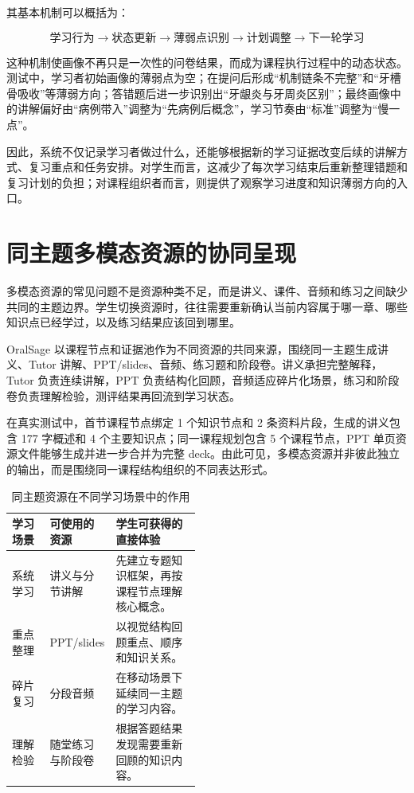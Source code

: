 其基本机制可以概括为：

\[
\text{学习行为}
\rightarrow
\text{状态更新}
\rightarrow
\text{薄弱点识别}
\rightarrow
\text{计划调整}
\rightarrow
\text{下一轮学习}
\]

这种机制使画像不再只是一次性的问卷结果，而成为课程执行过程中的动态状态。测试中，学习者初始画像的薄弱点为空；在提问后形成“机制链条不完整”和“牙槽骨吸收”等薄弱方向；答错题后进一步识别出“牙龈炎与牙周炎区别”；最终画像中的讲解偏好由“病例带入”调整为“先病例后概念”，学习节奏由“标准”调整为“慢一点”。

因此，系统不仅记录学习者做过什么，还能够根据新的学习证据改变后续的讲解方式、复习重点和任务安排。对学生而言，这减少了每次学习结束后重新整理错题和复习计划的负担；对课程组织者而言，则提供了观察学习进度和知识薄弱方向的入口。

\section{同主题多模态资源的协同呈现}

多模态资源的常见问题不是资源种类不足，而是讲义、课件、音频和练习之间缺少共同的主题边界。学生切换资源时，往往需要重新确认当前内容属于哪一章、哪些知识点已经学过，以及练习结果应该回到哪里。

OralSage 以课程节点和证据池作为不同资源的共同来源，围绕同一主题生成讲义、Tutor 讲解、PPT/slides、音频、练习题和阶段卷。讲义承担完整解释，Tutor 负责连续讲解，PPT 负责结构化回顾，音频适应碎片化场景，练习和阶段卷负责理解检验，测评结果再回流到学习状态。

在真实测试中，首节课程节点绑定 1 个知识节点和 2 条资料片段，生成的讲义包含 177 字概述和 4 个主要知识点；同一课程规划包含 5 个课程节点，PPT 单页资源文件能够生成并进一步合并为完整 deck。由此可见，多模态资源并非彼此独立的输出，而是围绕同一课程结构组织的不同表达形式。

\begin{table}[H]
  \centering
  \caption{同主题资源在不同学习场景中的作用}
  \label{tab:innovation-resource-experience}
  \begin{tabularx}{\linewidth}{p{0.20\linewidth}p{0.27\linewidth}X}
    \toprule
    学习场景 & 可使用的资源 & 学生可获得的直接体验 \\
    \midrule
    系统学习 & 讲义与分节讲解 & 先建立专题知识框架，再按课程节点理解核心概念。 \\
    重点整理 & PPT/slides & 以视觉结构回顾重点、顺序和知识关系。 \\
    碎片复习 & 分段音频 & 在移动场景下延续同一主题的学习内容。 \\
    理解检验 & 随堂练习与阶段卷 & 根据答题结果发现需要重新回顾的知识内容。 \\
    \bottomrule
  \end{tabularx}
\end{table}

